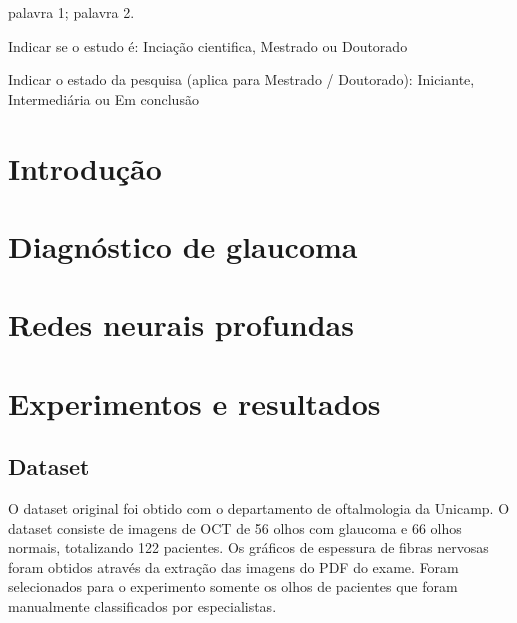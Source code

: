\documentclass[conference]{IEEEtran}
\begin{document}
\renewcommand\IEEEkeywordsname{Palavras-chave}
\begin{IEEEkeywords}
\label{Palavras-chave}
palavra 1; palavra 2.
\end{IEEEkeywords}

\renewcommand\IEEEkeywordsname{Classifica\c{c}\~{a}o}
\begin{IEEEkeywords}
	\label{classificacao}
	Indicar se o estudo \'{e}: Incia\c{c}\~{a}o cientifica, Mestrado ou Doutorado
\end{IEEEkeywords}

\renewcommand\IEEEkeywordsname{Categoria}
\begin{IEEEkeywords}
	\label{Categoria}
	Indicar o estado da pesquisa (aplica para Mestrado / Doutorado): 
 	Iniciante, Intermedi\'{a}ria ou Em conclus\~{a}o 
\end{IEEEkeywords}
%
\IEEEpeerreviewmaketitle


\section{Introdução}

\section{Diagnóstico de glaucoma}

\section{Redes neurais profundas}

\section{Experimentos e resultados}

  \subsection{Dataset}

  O dataset original foi obtido com o departamento de oftalmologia da Unicamp. O dataset consiste de imagens de OCT de 56 olhos com glaucoma e 66 olhos normais, totalizando 122 pacientes. Os gráficos de espessura de fibras nervosas foram obtidos através da extração das imagens do PDF do exame. Foram selecionados para o experimento somente os olhos de pacientes que foram manualmente classificados por especialistas.
\end{document}
